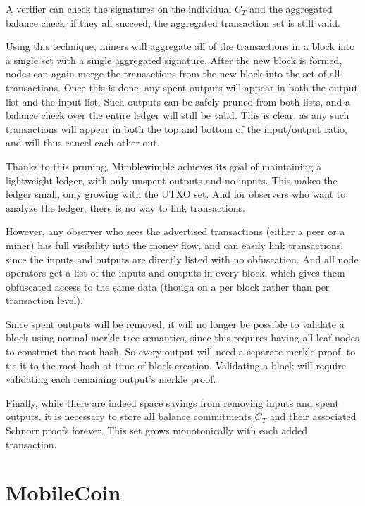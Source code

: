 \documentclass{article}
\begin{document}
A verifier can check the signatures on the individual $C_T$ and the aggregated balance check; if they all succeed, the aggregated transaction set is still valid.

Using this technique, miners will aggregate all of the transactions in a block into a single set with a single aggregated signature.  After the new block is formed, nodes can again merge the transactions from the new block into the set of all transactions.  Once this is done, any spent outputs will appear in both the output list and the input list.  Such outputs can be safely pruned from both lists, and a balance check over the entire ledger will still be valid.  This is clear, as any such transactions will appear in both the top and bottom of the input/output ratio, and will thus cancel each other out.  

Thanks to this pruning, Mimblewimble achieves its goal of maintaining a lightweight ledger, with only unspent outputs and no inputs.  This makes the ledger small, only growing with the UTXO set.  And for observers who want to analyze the ledger, there is no way to link transactions.

However, any observer who sees the advertised transactions (either a peer or a miner) has full visibility into the money flow, and can easily link transactions, since the inputs and outputs are directly listed with no obfuscation.  And all node operators get a list of the inputs and outputs in every block, which gives them obfuscated access to the same data (though on a per block rather than per transaction level).

Since spent outputs will be removed, it will no longer be possible to validate a block using normal merkle tree semantics, since this requires having all leaf nodes to construct the root hash.  So every output will need a separate merkle proof, to tie it to the root hash at time of block creation.  Validating a block will require validating each remaining output's merkle proof.

Finally, while there are indeed space savings from removing inputs and spent outputs, it is necessary to store all balance commitments $C_T$ and their associated Schnorr proofs forever.  This set grows monotonically with each added transaction.  



\section{MobileCoin}
\end{document}
